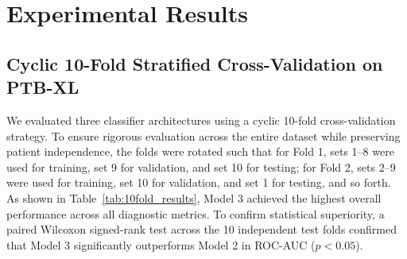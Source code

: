\documentclass[5p,twocolumn,10pt]{elsarticle}
\begin{document}
\section{Experimental Results}
\label{sec:results}

\subsection{Cyclic 10-Fold Stratified Cross-Validation on PTB-XL}
We evaluated three classifier architectures using a cyclic 10-fold cross-validation strategy. To ensure rigorous evaluation across the entire dataset while preserving patient independence, the folds were rotated such that for Fold 1, sets 1--8 were used for training, set 9 for validation, and set 10 for testing; for Fold 2, sets 2--9 were used for training, set 10 for validation, and set 1 for testing, and so forth. As shown in Table~\ref{tab:10fold_results}, Model 3 achieved the highest overall performance across all diagnostic metrics. To confirm statistical superiority, a paired Wilcoxon signed-rank test across the 10 independent test folds confirmed that Model 3 significantly outperforms Model 2 in ROC-AUC ($p < 0.05$).

\begin{table}[t]
\caption{10-Fold Stratified Cross-Validation Benchmark Results on PTB-XL. Mean $\pm$ Std [95\% CI] across 10 cyclic folds.}
\label{tab:10fold_results}
\centering
\small
\setlength{\tabcolsep}{4.5pt}
\end{table}
\end{document}
